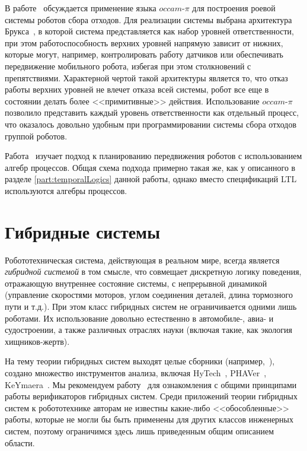 \documentclass[a4, 14pt]{article}
\begin{document}
В работе~\cite{posso2011process} обсуждается применение языка $occam\mbox{-}\pi$ для 
построения роевой~\cite{csahin2005swarm} системы роботов сбора отходов. 
Для реализации системы выбрана архитектура Брукса~\cite{brooks1986layered}, в 
которой система представляется как набор уровней ответственности, при этом 
работоспособность верхних уровней напрямую зависит от нижних, которые могут, 
например, контролировать работу датчиков или обеспечивать передвижение 
мобильного робота, избегая при этом столкновений с препятствиями. Характерной 
чертой такой архитектуры является то, что отказ работы верхних уровней не влечет 
отказа всей системы, робот все еще в состоянии делать более <<примитивные>> 
действия. Использование $occam\mbox{-}\pi$ позволило представить каждый уровень 
ответственности как отдельный процесс, что оказалось довольно удобным при 
программировании системы сбора отходов группой роботов.

Работа~\cite{varricchio2014sampling} изучает подход к планированию передвижения 
роботов с использованием алгебр процессов. Общая схема подхода примерно такая 
же, как у описанного в разделе \ref{part:temporalLogics} данной работы, однако 
вместо спецификаций LTL используются алгебры процессов.

\section{Гибридные системы}
Робототехническая система, действующая в реальном мире, всегда является 
\textit{гибридной системой} в том смысле, что совмещает дискретную логику поведения, 
отражающую внутреннее состояние системы, с непрерывной динамикой (управление 
скоростями моторов, углом соединения деталей, длина тормозного пути и т.д.). 
При этом класс гибридных систем не ограничивается одними лишь роботами. Их 
использование довольно естественно в автомобиле-, авиа- и судостроении, а также 
различных отраслях науки (включая такие, как экология хищников-жертв).

На тему теории гибридных систем выходят целые сборники 
(например,~\cite{vaandrager1999hybrid, lynch2007hybrid}), 
создано множество инструментов анализа, включая HyTech~\cite{henzinger1997hytech}, 
PHAVer~\cite{frehse2005phaver}, KeYmaera~\cite{platzer2008keymaera}. 
Мы рекомендуем работу~\cite{alur1995algorithmic} для ознакомления с общими 
принципами работы верификаторов гибридных систем. Среди приложений теории 
гибридных систем к робототехнике авторам не известны какие-либо <<обособленные>> 
работы, которые не могли бы быть применены для других классов инженерных систем, 
поэтому ограничимся здесь лишь приведенным общим описанием области.
\end{document}
